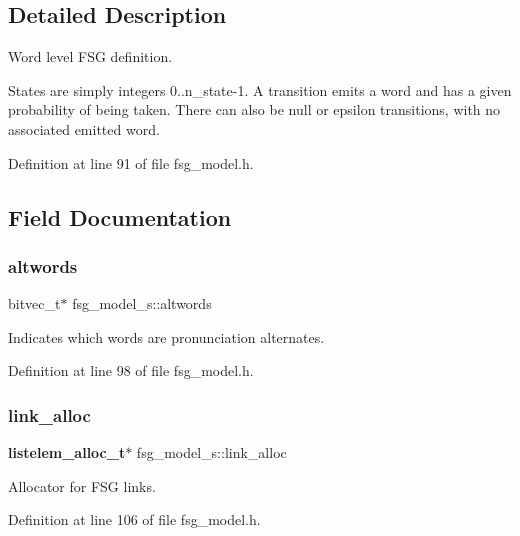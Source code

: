 \subsection{Detailed Description}
Word level F\+SG definition. 

States are simply integers 0..n\+\_\+state-\/1. A transition emits a word and has a given probability of being taken. There can also be null or epsilon transitions, with no associated emitted word. 

Definition at line 91 of file fsg\+\_\+model.\+h.



\subsection{Field Documentation}
\mbox{\label{structfsg__model__s_adb51d840853d7ef3315bd833cddeb748}} 
\subsubsection{altwords}
{\footnotesize\ttfamily bitvec\+\_\+t$\ast$ fsg\+\_\+model\+\_\+s\+::altwords}



Indicates which words are pronunciation alternates. 



Definition at line 98 of file fsg\+\_\+model.\+h.

\mbox{\label{structfsg__model__s_ac4e2a36305bbe62a5c7468588eb058b1}} 
\subsubsection{link\+\_\+alloc}
{\footnotesize\ttfamily \textbf{ listelem\+\_\+alloc\+\_\+t}$\ast$ fsg\+\_\+model\+\_\+s\+::link\+\_\+alloc}



Allocator for F\+SG links. 



Definition at line 106 of file fsg\+\_\+model.\+h.

\mbox{\label{structfsg__model__s_ab0b22dadb593ee1901829f89c4a47fe2}} 
